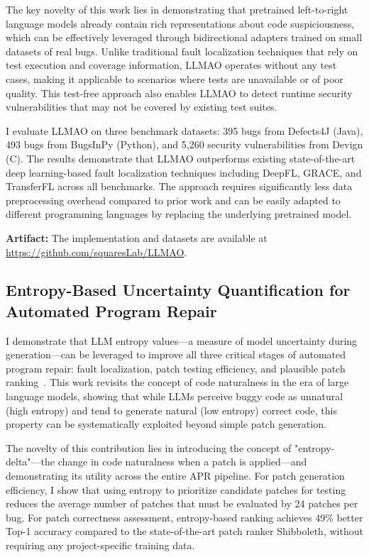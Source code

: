 \documentclass[12pt,openany,oneside,table]{cmuthesis}
\begin{document}
The key novelty of this work lies in demonstrating that pretrained left-to-right language models already contain rich representations about code suspiciousness, which can be effectively leveraged through bidirectional adapters trained on small datasets of real bugs. Unlike traditional fault localization techniques that rely on test execution and coverage information, LLMAO operates without any test cases, making it applicable to scenarios where tests are unavailable or of poor quality. This test-free approach also enables LLMAO to detect runtime security vulnerabilities that may not be covered by existing test suites.

I evaluate LLMAO on three benchmark datasets: 395 bugs from Defects4J (Java), 493 bugs from BugsInPy (Python), and 5,260 security vulnerabilities from Devign (C). The results demonstrate that LLMAO outperforms existing state-of-the-art deep learning-based fault localization techniques including DeepFL, GRACE, and TransferFL across all benchmarks. The approach requires significantly less data preprocessing overhead compared to prior work and can be easily adapted to different programming languages by replacing the underlying pretrained model.

\textbf{Artifact:} The implementation and datasets are available at \url{https://github.com/squaresLab/LLMAO}.

\subsection{Entropy-Based Uncertainty Quantification for Automated Program Repair}

I demonstrate that LLM entropy values—a measure of model uncertainty during generation—can be leveraged to improve all three critical stages of automated program repair: fault localization, patch testing efficiency, and plausible patch ranking~\cite{yang2024revisiting}. This work revisits the concept of code naturalness in the era of large language models, showing that while LLMs perceive buggy code as unnatural (high entropy) and tend to generate natural (low entropy) correct code, this property can be systematically exploited beyond simple patch generation.

The novelty of this contribution lies in introducing the concept of "entropy-delta"—the change in code naturalness when a patch is applied—and demonstrating its utility across the entire APR pipeline. For patch generation efficiency, I show that using entropy to prioritize candidate patches for testing reduces the average number of patches that must be evaluated by 24 patches per bug. For patch correctness assessment, entropy-based ranking achieves 49\% better Top-1 accuracy compared to the state-of-the-art patch ranker Shibboleth, without requiring any project-specific training data.
\end{document}
